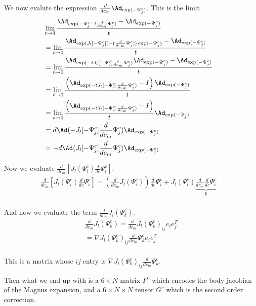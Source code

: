 \documentclass[12pt]{article}
\begin{document}
We now evalute the expression $\frac{d}{dc_m}\Ad_{\exp(-\Psi^c_j)}$. This is the limit
\[
\begin{aligned}
  &\lim_{t \rightarrow 0}\frac{\Ad_{\exp(-\Psi^c_j - t \frac{d}{dc_m}\Psi^c_j)} - \Ad_{\exp(-\Psi^c_j)} }{ t } \\
  &= \lim_{t \rightarrow 0}\frac{\Ad_{\exp(J_l[-\Psi^c_j](-t\frac{d}{dc_m}\Psi^c_j))\exp(-\Psi^c_j)} - \Ad_{\exp(-\Psi^c_j)} }{ t } \\
  &= \lim_{t \rightarrow 0}\frac{\Ad_{\exp(-t J_l[-\Psi^c_j]\frac{d}{dc_m}\Psi^c_j)}\Ad_{\exp(-\Psi^c_j)} - \Ad_{\exp(-\Psi^c_j)} }{ t } \\
  &= \lim_{t \rightarrow 0}\frac{\left(\Ad_{\exp(-t J_l[-\Psi^c_j]\frac{d}{dc_m}\Psi^c_j)} - I\right)\Ad_{\exp(-\Psi^c_j)}  }{ t } \\
  &= \lim_{t \rightarrow 0}\frac{\left(\Ad_{\exp(-t J_l[-\Psi^c_j]\frac{d}{dc_m}\Psi^c_j)} - I\right)}{t}\Ad_{\exp(-\Psi^c_j)} \\
  &= d\Ad(- J_l[-\Psi^c_j]\frac{d}{dc_m}\Psi^c_j)\Ad_{\exp(-\Psi^c_j)} \\
  &= -d\Ad(J_l[-\Psi^c_j]\frac{d}{dc_m}\Psi^c_j)\Ad_{\exp(-\Psi^c_j)} \\
\end{aligned}
\]

Now we evaluate $\frac{d}{dc_m}\left[J_l(\Psi^c_i)\frac{d}{dc}\Psi^c_i \right]$.
\[
  \begin{aligned}
    \frac{d}{dc_m}\left[J_l(\Psi^c_i)\frac{d}{dc}\Psi^c_i \right] = \left(\frac{d}{dc_m}J_l(\Psi^c_i)\right)\frac{d}{dc}\Psi^c_i + J_l(\Psi^c_i)\underbrace{\frac{d}{dc_m}\frac{d}{dc}\Psi^c_i}_0 \\
  \end{aligned}
\]

And now we evaluate the term $\frac{d}{dc_m}J_l(\Psi^c_k)$.
\[
  \begin{aligned}
    &\frac{d}{dc_m} J_l(\Psi^c_k) = \frac{d}{dc_m} J_l(\Psi^c_k)_{ij} e_i e_j^T \\
    &= \nabla J_l(\Psi^c_k)_{ij} \frac{d}{d c_m} \Psi^c_k e_i e_j^T \\
  \end{aligned}
\]

This is a matrix whose $ij$ entry is $\nabla J_l(\Psi^c_k)_{ij} \frac{d}{d c_m} \Psi^c_k$.


Then what we end up with is a $6 \times N$ matrix $F^c$ which encodes the body jacobian of the Magnus expansion,
and a $6 \times N \times N$ tensor $G^c$ which is the second order correction.
\end{document}
